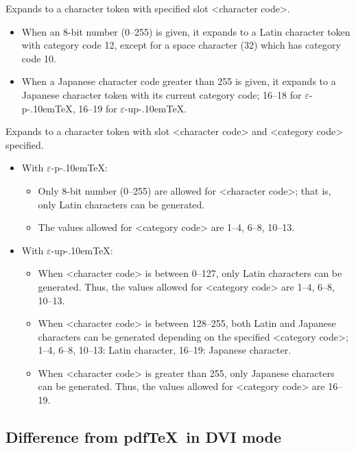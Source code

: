 \documentclass[a4paper,11pt]{article}
\def\epTeX{$\varepsilon$-\pTeX}\def\eTeX{$\varepsilon$-\TeX}
\def\eupTeX{$\varepsilon$-\upTeX}\def\upTeX{u\pTeX}
\def\pTeX{p\kern-.10em\TeX}
\def\pdfTeX{pdf\TeX}
\begin{document}
\begin{simplelist}
  Expands to a character token with specified slot <character code>.
  \begin{itemize}
   \item When an 8-bit number (0--255) is given,
     it expands to a Latin character token with category code 12,
     except for a space character (32) which has category code 10.
   \item When a Japanese character code greater than 255 is given,
     it expands to a Japanese character token with its current category code;
     16--18 for \epTeX, 16--19 for \eupTeX.
  \end{itemize}

  Expands to a character token with slot <character code> and
  <category code> specified.
  \begin{itemize}
   \item With \epTeX:
     \begin{itemize}
      \item Only 8-bit number (0--255) are allowed for <character code>;
        that is, only Latin characters can be generated.
      \item The values allowed for <category code> are 1--4, 6--8, 10--13.
     \end{itemize}
   \item With \eupTeX:
     \begin{itemize}
      \item When <character code> is between 0--127,
        only Latin characters can be generated.
        Thus, the values allowed for <category code> are
        1--4, 6--8, 10--13.
      \item When <character code> is between 128--255,
        both Latin and Japanese characters can be generated
        depending on the specified <category code>;
        1--4, 6--8, 10--13: Latin character,
        16--19: Japanese character.
      \item When <character code> is greater than 255,
        only Japanese characters can be generated.
        Thus, the values allowed for <category code> are
        16--19.
     \end{itemize}
  \end{itemize}
\end{simplelist}

\subsection{Difference from \pdfTeX\ in DVI mode}\label{dvi-pdftex}
\end{document}
